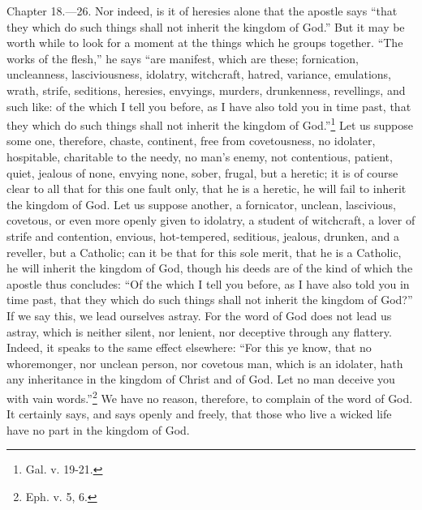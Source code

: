 
Chapter 18.—26. Nor indeed, is it of heresies alone that the apostle says ``that they which do such things shall not inherit the kingdom of God.'' But it may be worth while to look for a moment at the things which he groups together. ``The works of the flesh,'' he says ``are manifest, which are these; fornication, uncleanness, lasciviousness, idolatry, witchcraft, hatred, variance, emulations, wrath, strife, seditions, heresies, envyings, murders, drunkenness, revellings, and such like: of the which I tell you before, as I have also told you in time past, that they which do such things shall not inherit the kingdom of God.''\footnote{\par  Gal. v. 19-21.} Let us suppose some one, therefore, chaste, continent, free from covetousness, no idolater, hospitable, charitable to the needy, no man’s enemy, not contentious, patient, quiet, jealous of none, envying none, sober, frugal, but a heretic; it is of course clear to all that for this one fault only, that he is a heretic, he will fail to inherit the kingdom of God. Let us suppose another, a fornicator, unclean, lascivious, covetous, or even more openly given to idolatry, a student of witchcraft, a lover of strife and contention, envious, hot-tempered, seditious, jealous, drunken, and a reveller, but a Catholic; can it be that for this sole merit, that he is a Catholic, he will inherit the kingdom of God, though his deeds are of the kind of which the apostle thus concludes: ``Of the which I tell you before, as I have also told you in time past, that they which do such things shall not inherit the kingdom of God?'' If we say this, we lead ourselves astray. For the word of God does not lead us astray, which is neither silent, nor lenient, nor deceptive through any flattery. Indeed, it speaks to the same effect elsewhere: ``For this ye know, that no whoremonger, nor unclean person, nor covetous man, which is an idolater, hath any inheritance in the kingdom of Christ and of God. Let no man deceive you with vain words.''\footnote{\par  Eph. v. 5, 6.} We have no reason, therefore, to complain of the word of God. It certainly says, and says openly and freely, that those who live a wicked life have no part in the kingdom of God.


